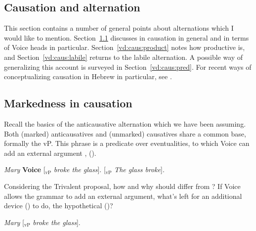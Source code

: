 \begin{exe}
\begin{xlist}
\begin{xlist}
\begin{exe}
\begin{exe}
\begin{xlist}
\begin{exe}
\begin{xlist}
\begin{exe}
\begin{xlist}
\begin{xlist}
\begin{exe}
\begin{xlist}
\begin{exe}
\begin{xlist}
\begin{exe}
\begin{exe}
\begin{exe}
\begin{xlist}
\begin{exe}
\begin{exe}
\begin{xlist}
\begin{xlist}
\begin{exe}
\begin{xlist}
\begin{exe}
\begin{exe}
\begin{exe}
\begin{xlist}
\begin{exe}
\begin{exe}
\begin{xlist}
\begin{exe}
\begin{xlist}
\begin{exe}
\begin{xlist}
\section{Causation and alternation} \label{vd:caus}
This section contains a number of general points about  alternations which I would like to mention. Section~\ref{vd:caus:mrkd} discusses  in causation in general and in terms of Voice heads in particular. Section~\ref{vd:caus:product} notes how productive {\vd} is, and Section~\ref{vd:caus:labile} returns to the labile alternation. A possible way of generalizing this account is surveyed in Section~\ref{vd:caus:pred}. For recent ways of conceptualizing causation in Hebrew in particular, see \cite{barashersiegalboneh18wccfl}.

	\subsection{Markedness in causation} \label{vd:caus:mrkd}
Recall the basics of the anticausative alternation which we have been assuming. Both (marked) anticausatives and (unmarked) causatives share a common base, formally the vP. This phrase is a predicate over eventualities, to which Voice can add an external argument \citep{schaefer08,layering15}, (\nextx).
 \begin{exe}
 \ex   
 \begin{xlist} 
 	\ex  \emph{Mary} \textbf{Voice} [$_{\text{vP}}$ \emph{broke the glass}]. 
 	\ex  {\zero} \textbf{\vz} [$_{\text{vP}}$ \emph{The glass broke}]. 
 \z
\z 

Considering the Trivalent proposal, how and why should {\vd} differ from ? If Voice allows the grammar to add an external argument, what's left for an additional device (\vd) to do, the hypothetical (\nextx)?
 \begin{exe}
\ex  \emph{Mary} \textbf{\vd} [$_{\text{vP}}$ \emph{broke the glass}]. 
 \z 


\end{exe}
\end{xlist}
\end{exe}
\end{xlist}
\end{exe}
\end{xlist}
\end{exe}
\end{xlist}
\end{exe}
\end{exe}
\end{xlist}
\end{exe}
\end{exe}
\end{exe}
\end{xlist}
\end{exe}
\end{xlist}
\end{xlist}
\end{exe}
\end{exe}
\end{xlist}
\end{exe}
\end{exe}
\end{exe}
\end{xlist}
\end{exe}
\end{xlist}
\end{exe}
\end{xlist}
\end{xlist}
\end{exe}
\end{xlist}
\end{exe}
\end{xlist}
\end{exe}
\end{exe}
\end{xlist}
\end{xlist}
\end{exe}
